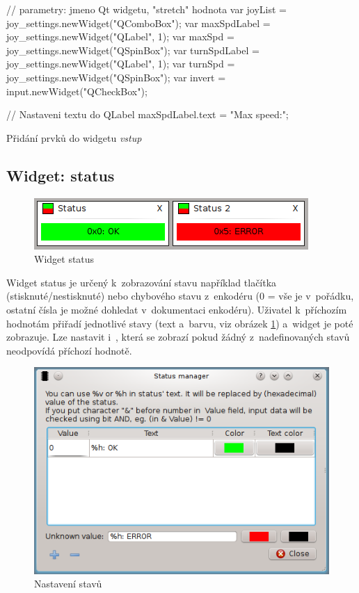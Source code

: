 \documentclass[12pt, a4paper, oneside]{article}
\newcommand{\It}{\textit}  %
\begin{document}
\begin{listing}[H]
\begin{jscode}
// parametry: jmeno Qt widgetu, "stretch" hodnota
var joyList = joy_settings.newWidget("QComboBox");
var maxSpdLabel = joy_settings.newWidget("QLabel", 1);
var maxSpd = joy_settings.newWidget("QSpinBox");
var turnSpdLabel = joy_settings.newWidget("QLabel", 1);
var turnSpd = joy_settings.newWidget("QSpinBox");
var invert = input.newWidget("QCheckBox");

// Nastaveni textu do QLabel
maxSpdLabel.text = "Max speed:";
\end{jscode}
\caption{Přidání prvků do widgetu \It{vstup}}
\label{input_script}
\end{listing}

\subsection{Widget: status}
\begin{figure}[H]
\begin{center}
\includegraphics[scale=1]{img/w_status.png}
\caption{Widget status}
\end{center}
\end{figure}
Widget status je určený k~zobrazování stavu například tlačítka (stisknuté/nestisknuté) nebo chybového stavu z~enkodéru (0 = vše je v~pořádku, ostatní čísla je možné dohledat v~dokumentaci enkodéru). Uživatel k~příchozím hodnotám přiřadí jednotlivé stavy (text a~barvu, viz obrázek \ref{status_dlg}) a~widget je poté zobrazuje. Lze nastavit i~, která se zobrazí pokud žádný z~nadefinovaných stavů neodpovídá příchozí hodnotě.
\begin{figure}[H]
\begin{center}
\includegraphics[scale=1]{img/w_status_dlg.png}
\caption{Nastavení stavů}
\label{status_dlg}
\end{center}
\end{figure} 
\end{document}

